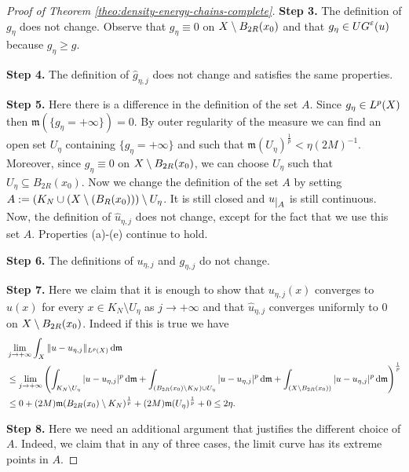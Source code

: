 \documentclass[10pt,a4paper]{amsart}
\newcommand{\UG}[1]{{\rm UG}^{#1}}
\newcommand{\X}{{\rm X}}
\newcommand{\mm}{\mathfrak m}
\newcommand{\restr}[1]{\lower3pt\hbox{$|_{#1}$}}
\renewcommand{\d}{{\mathrm d}}
\begin{document}
\begin{proof}[Proof of Theorem \ref{theo:density-energy-chains-complete}]
    {\bf Step 3.} The definition of $g_\eta$ does not change. Observe that $g_\eta \equiv 0$ on $\X \setminus B_{2R}(x_0)$ and that $g_\eta \in \UG{\varepsilon}(u)$ because $g_\eta \ge g$.
    
    {\bf Step 4.} The definition of $\hat{g}_{\eta,j}$ does not change and satisfies the same properties.
    
    {\bf Step 5.} Here there is a difference in the definition of the set $A$. Since $g_\eta \in L^p(\X)$ then $\mm(\{g_\eta = +\infty \})=0$. By outer regularity of the measure we can find an open set $U_\eta$ containing $\{g_\eta = +\infty \}$ and such that $\mm(U_\eta)^{\frac{1}{p}} < \eta (2M)^{-1}$. Moreover, since $g_\eta \equiv 0$ on $\X \setminus B_{2R}(x_0)$, we can choose $U_\eta$ such that $U_\eta \subseteq B_{2R}(x_0)$.
    Now we change the definition of the set $A$ by setting $A := (K_N \cup (\X \setminus (B_R(x_0))) \setminus U_\eta$. It is still closed and $u\restr{A}$ is still continuous.
    Now, the definition of $\hat{u}_{\eta,j}$ does not change, except for the fact that we use this set $A$. Properties (a)-(e) continue to hold.

    {\bf Step 6.} The definitions of $u_{\eta,j}$ and $g_{\eta,j}$ do not change.
    
    {\bf Step 7.} Here we claim that it is enough to show that $u_{\eta,j}(x)$ converges to $u(x)$ for every $x\in K_N\setminus U_\eta$ as $j \to +\infty$ and that $\hat{u}_{\eta,j}$ converges uniformly to $0$ on $\X\setminus B_{2R}(x_0)$. Indeed if this is true we have
    \begin{equation}
        \begin{aligned}
            &\lim_{j\to +\infty} \int_\X \Vert u - u_{\eta,j} \Vert_{L^p(\X)} \,\d\mm \\
            &\le\lim_{j\to +\infty}\left(\int_{K_N \setminus U_\eta} \vert u - u_{\eta,j} \vert^p \,\d\mm + \int_{(B_{2R}(x_0)\setminus K_N) \cup U_\eta} \vert u - u_{\eta,j} \vert^p \,\d\mm + \int_{(\X \setminus B_{2R}(x_0))} \vert u - u_{\eta,j} \vert^p \,\d\mm \right)^{\frac{1}{p}}\\
            &\le 0 + (2M) \mm(B_{2R}(x_0) \setminus K_N)^{\frac{1}{p}} + (2M)\mm(U_\eta)^{\frac{1}{p}} + 0 \le 2\eta.
        \end{aligned}
    \end{equation}

    {\bf Step 8.} Here we need an additional argument that justifies the different choice of $A$. Indeed, we claim that in any of three cases, the limit curve has its extreme points in $A$.
    

\end{proof}
\end{document}
